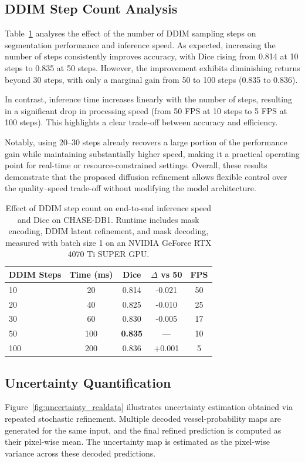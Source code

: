 \documentclass[journal,article,submit,pdftex,moreauthors]{Definitions/mdpi}
\begin{document}

\subsection{DDIM Step Count Analysis}

Table~\ref{tab:ddim_steps} analyses the effect of the number of DDIM sampling steps on segmentation performance and inference speed. As expected, increasing the number of steps consistently improves accuracy, with Dice rising from 0.814 at 10 steps to 0.835 at 50 steps. However, the improvement exhibits diminishing returns beyond 30 steps, with only a marginal gain from 50 to 100 steps (0.835 to 0.836).

In contrast, inference time increases linearly with the number of steps, resulting in a significant drop in processing speed (from 50 FPS at 10 steps to 5 FPS at 100 steps). This highlights a clear trade-off between accuracy and efficiency.

Notably, using 20–30 steps already recovers a large portion of the performance gain while maintaining substantially higher speed, making it a practical operating point for real-time or resource-constrained settings. Overall, these results demonstrate that the proposed diffusion refinement allows flexible control over the quality–speed trade-off without modifying the model architecture.

\begin{table}[H]
\centering
\caption{Effect of DDIM step count on end-to-end inference speed and Dice on CHASE-DB1. Runtime includes mask encoding, DDIM latent refinement, and mask decoding, measured with batch size 1 on an NVIDIA GeForce RTX 4070 Ti SUPER GPU.}
\begin{tabular}{lcccc}
\toprule
DDIM Steps & Time (ms) & Dice & $\Delta$ vs 50 & FPS \\
\midrule
10  & 20  & 0.814 & -0.021 & 50 \\
20  & 40  & 0.825 & -0.010 & 25 \\
30  & 60  & 0.830 & -0.005 & 17 \\
50  & 100 & \textbf{0.835} & --- & 10 \\
100 & 200 & 0.836 & +0.001 & 5 \\
\bottomrule
\end{tabular}
\label{tab:ddim_steps}
\end{table}


\subsection{Uncertainty Quantification}
\label{sec:uncertainty}
Figure~\ref{fig:uncertainty_realdata} illustrates uncertainty estimation obtained via repeated stochastic refinement. Multiple decoded vessel-probability maps are generated for the same input, and the final refined prediction is computed as their pixel-wise mean. The uncertainty map is estimated as the pixel-wise variance across these decoded predictions.
\end{document}
